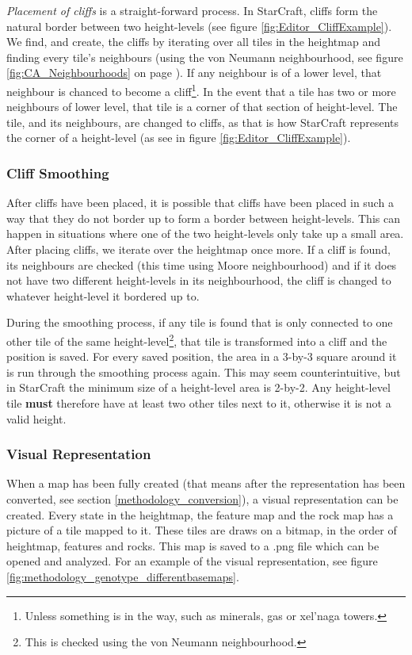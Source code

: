 \textit{Placement of cliffs} is a straight-forward process. In StarCraft, cliffs form the natural border between two height-levels (see figure \ref{fig:Editor_CliffExample}). We find, and create, the cliffs by iterating over all tiles in the heightmap and finding every tile's neighbours (using the von Neumann neighbourhood, see figure \ref{fig:CA_Neighbourhoods} on page \pageref{fig:CA_Neighbourhoods}). If any neighbour is of a lower level, that neighbour is chanced to become a cliff\footnote{Unless something is in the way, such as minerals, gas or xel'naga towers.}. In the event that a tile has two or more neighbours of lower level, that tile is a corner of that section of height-level. The tile, and its neighbours, are changed to cliffs, as that is how StarCraft represents the corner of a height-level (as see in figure \ref{fig:Editor_CliffExample}).


\subsubsection{Cliff Smoothing}

After cliffs have been placed, it is possible that cliffs have been placed in such a way that they do not border up to form a border between height-levels. This can happen in situations where one of the two height-levels only take up a small area. After placing cliffs, we iterate over the heightmap once more. If a cliff is found, its neighbours are checked (this time using Moore neighbourhood) and if it does not have two different height-levels in its neighbourhood, the cliff is changed to whatever height-level it bordered up to. 

During the smoothing process, if any tile is found that is only connected to one other tile of the same height-level\footnote{This is checked using the von Neumann neighbourhood.}, that tile is transformed into a cliff and the position is saved. For every saved position, the area in a 3-by-3 square around it is run through the smoothing process again. This may seem counterintuitive, but in StarCraft the minimum size of a height-level area is 2-by-2. Any height-level tile \textbf{must} therefore have at least two other tiles next to it, otherwise it is not a valid height.

\subsubsection{Visual Representation}
When a map has been fully created (that means after the representation has been converted, see section \ref{methodology_conversion}), a visual representation can be created. Every state in the heightmap, the feature map and the rock map has a picture of a tile mapped to it. These tiles are draws on a bitmap, in the order of heightmap, features and rocks. This map is saved to a .png file which can be opened and analyzed. For an example of the visual representation, see figure \ref{fig:methodology_genotype_differentbasemaps}.